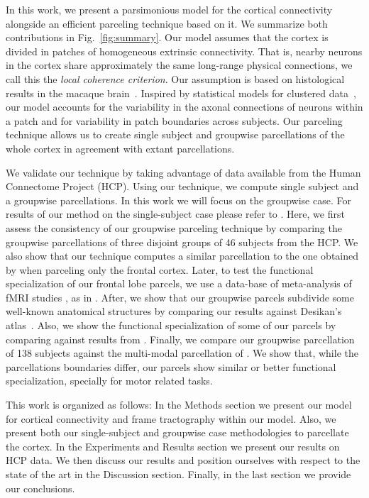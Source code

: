 In this work, we present a parsimonious model for the cortical
connectivity alongside an efficient parceling technique based on it. We summarize
both contributions in Fig.~\ref{fig:summary}. Our model assumes that the cortex is
divided in patches of homogeneous extrinsic connectivity. That is, nearby
neurons in the cortex share approximately the same long-range physical
connections, we call this the \textit{local coherence criterion}. Our assumption
is based on histological results in the macaque brain~\citep{Schmahmann2006}.
Inspired by statistical models for clustered data~\citep{Pendergast1996}, our model
accounts for the variability in the axonal connections of neurons within a patch
and for variability in patch boundaries across subjects. Our parceling technique
allows us to create single subject and groupwise parcellations of the whole
cortex in agreement with extant parcellations.

We validate our technique by taking advantage of data available from the Human
Connectome Project (HCP). Using our technique, we compute single subject and a
groupwise parcellations. In this work we will focus on the groupwise case. For
results of our method on the single-subject case please refer to \citet{Gallardo2017}.
Here, we first assess the consistency of our groupwise parceling technique by
comparing the groupwise parcellations of three disjoint groups of 46 subjects
from the HCP. We also show that our technique computes a similar parcellation to
the one obtained by \citet{ThiebautdeSchotten2016} when parceling only the frontal
cortex. Later, to test the functional specialization of our frontal lobe parcels,
we use a data-base of meta-analysis of fMRI studies \citep{Yarkoni2011}, as in
\citet{ThiebautdeSchotten2016}. After, we show that our groupwise parcels subdivide
some well-known anatomical structures by comparing our results against Desikan's
atlas~\citep{Desikan2006}. Also, we show the functional specialization of some of
our parcels by comparing against results from \citet{Glasser2013}. Finally, we
compare our groupwise parcellation of 138 subjects against the multi-modal
parcellation of \citet{Glasser2016}. We show that, while the parcellations
boundaries differ, our parcels show similar or better functional specialization,
specially for motor related tasks.

This work is organized as follows: In the Methods section we present our
model for cortical connectivity and frame tractography within our model. Also,
we present both our single-subject and groupwise case methodologies to parcellate
the cortex. In the Experiments and Results section we present our results on HCP
data. We then discuss our results and position ourselves with respect to the state
of the art in the Discussion section. Finally, in the last section we provide our
conclusions.
%

